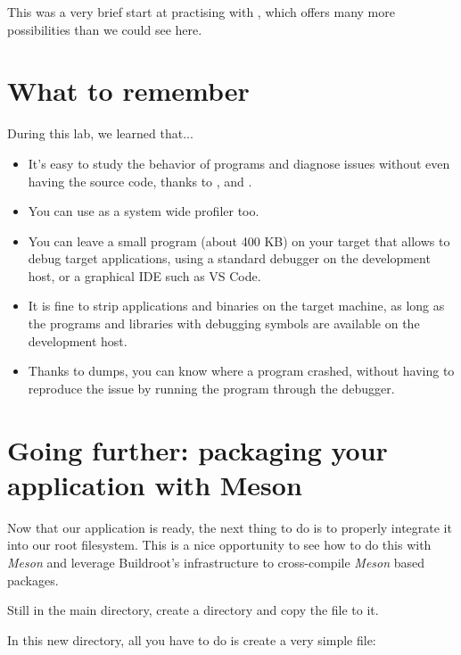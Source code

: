 This was a very brief start at practising with , which offers
many more possibilities than we could see here.

\section{What to remember}

During this lab, we learned that...

\begin{itemize}
\item It's easy to study the behavior of programs and diagnose issues
  without even having the source code, thanks to ,
   and .

\item You can use  as a system wide profiler too.

\item You can leave a small  program (about 400 KB) on your target
  that allows to debug target applications, using a standard 
  debugger on the development host, or a graphical IDE such as VS Code.

\item It is fine to strip applications and binaries on the target
  machine, as long as the programs and libraries with debugging
  symbols are available on the development host.

\item Thanks to  dumps, you can know where a program crashed,
  without having to reproduce the issue by running the program through
  the debugger.
\end{itemize}

\section{Going further: packaging your application with Meson}

Now that our application is ready, the next thing to do is to properly
integrate it into our root filesystem. This is a nice opportunity to see
how to do this with {\em Meson} and leverage Buildroot's
infrastructure to cross-compile {\em Meson} based packages.

Still in the main  directory, create a
 directory and copy the
 file to it.

In this new directory, all you have to do is create a very simple
 file:

